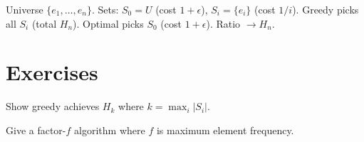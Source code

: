 \begin{example}
Universe $\{e_1, \dots, e_n\}$. Sets: $S_0 = U$ (cost $1+\epsilon$), $S_i = \{e_i\}$ (cost $1/i$). Greedy picks all $S_i$ (total $H_n$). Optimal picks $S_0$ (cost $1+\epsilon$). Ratio $\to H_n$.
\end{example}

\section{Exercises}
\begin{exercise}
Show greedy achieves $H_k$ where $k = \max_i |S_i|$.
\end{exercise}
\begin{exercise}
Give a factor-$f$ algorithm where $f$ is maximum element frequency.
\end{exercise}

